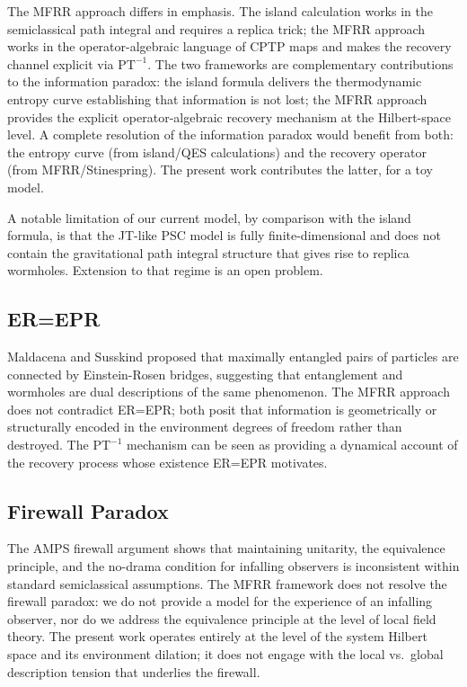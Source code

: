 \documentclass[11pt,twocolumn]{article}
\theoremstyle{remark}
\begin{document}
The MFRR approach differs in emphasis. The island calculation works in
the semiclassical path integral and requires a replica trick; the MFRR
approach works in the operator-algebraic language of CPTP maps and
makes the recovery channel explicit via $\mathrm{PT}^{-1}$. The two
frameworks are complementary contributions to the information paradox:
the island formula delivers the thermodynamic entropy curve establishing
that information is not lost; the MFRR approach provides the explicit
operator-algebraic recovery mechanism at the Hilbert-space level.
A complete resolution of the information paradox would benefit from
both: the entropy curve (from island/QES calculations) and the recovery
operator (from MFRR/Stinespring). The present work contributes the
latter, for a toy model.

A notable limitation of our current model, by comparison with the island
formula, is that the JT-like PSC model is fully finite-dimensional and
does not contain the gravitational path integral structure that gives
rise to replica wormholes. Extension to that regime is an open problem.

\subsection{ER=EPR}

Maldacena and Susskind \cite{MaldacenaSusskind2013} proposed that
maximally entangled pairs of particles are connected by Einstein-Rosen
bridges, suggesting that entanglement and wormholes are dual descriptions
of the same phenomenon. The MFRR approach does not contradict ER=EPR;
both posit that information is geometrically or structurally encoded in
the environment degrees of freedom rather than destroyed. The $\mathrm{PT}^{-1}$
mechanism can be seen as providing a dynamical account of the recovery
process whose existence ER=EPR motivates.

\subsection{Firewall Paradox}

The AMPS firewall argument \cite{AlmheiriMarolfPolchinskiSully2013} shows
that maintaining unitarity, the equivalence principle, and the no-drama
condition for infalling observers is inconsistent within standard
semiclassical assumptions. The MFRR framework does not resolve the
firewall paradox: we do not provide a model for the experience of an
infalling observer, nor do we address the equivalence principle at the
level of local field theory. The present work operates entirely at the
level of the system Hilbert space and its environment dilation; it does
not engage with the local vs.\ global description tension that underlies
the firewall.
\end{document}
